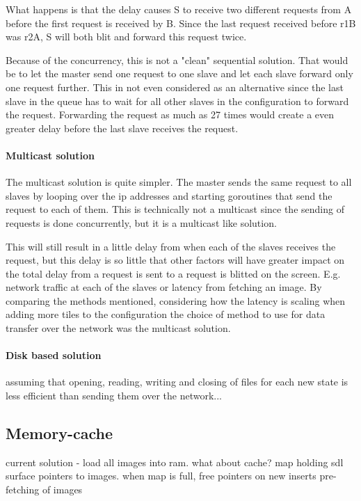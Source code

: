 \documentclass[12pt, a4paper, oneside]{article}
\begin{document}
What happens is that the delay causes S to receive two different requests from A before the first request is received by B. Since the last request received before r1B was r2A, S will both blit and forward this request twice. 

Because of the concurrency, this is not a "clean" sequential solution. That would be to let the master send one request to one slave and let each slave forward only one request further. This in not even considered as an alternative since the last slave in the queue has to wait for all other slaves in the configuration to forward the request. Forwarding the request as much as 27 times would create a even greater delay before the last slave receives the request.

\paragraph{Multicast solution}
The multicast solution is quite simpler. The master sends the same request to all slaves by looping over the ip addresses and starting goroutines that send the request to each of them. This is technically not a multicast since the sending of requests is done concurrently, but it is a multicast like solution.

This will still result in a little delay from when each of the slaves receives the request, but this delay is so little that other factors will have greater impact on the total delay from a request is sent to a request is blitted on the screen. E.g. network traffic at each of the slaves or latency from fetching an image.
\newline
\newline
By comparing the methods mentioned, considering how the latency is scaling when adding more tiles to the configuration the choice of method to use for data transfer over the network was the multicast solution. 

\paragraph{Disk based solution}
assuming that opening, reading, writing and closing of files for each new state is less efficient than sending them over the network...

\subsection{Memory-cache}
current solution - load all images into ram. what about cache?
map holding sdl surface pointers to images. when map is full, free pointers on new inserts
pre-fetching of images
\newpage
\end{document}
